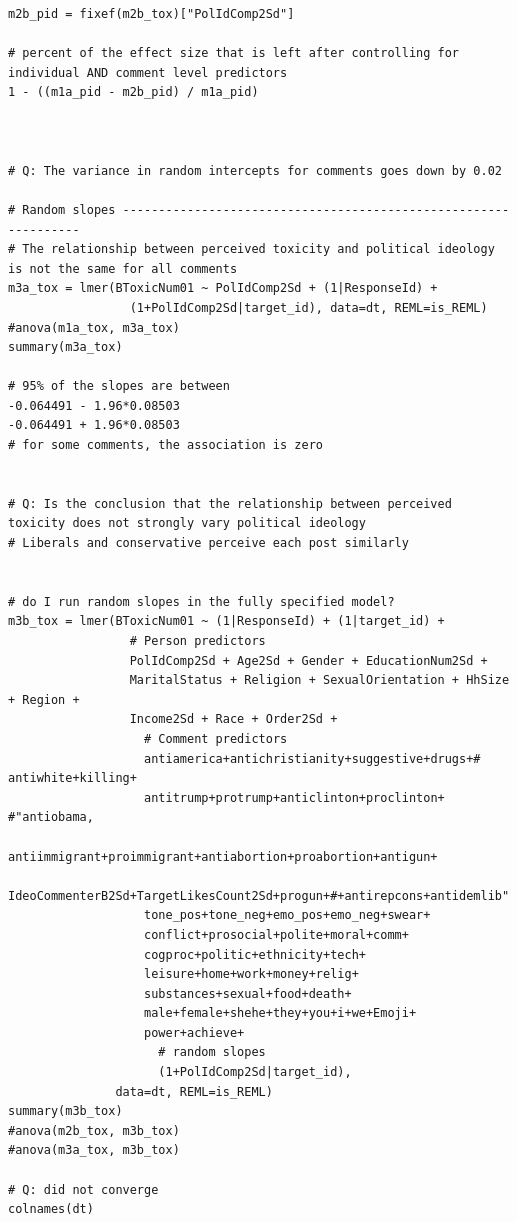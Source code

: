 \documentclass{article}
\begin{document}
\begin{lstlisting}
m2b_pid = fixef(m2b_tox)["PolIdComp2Sd"]

# percent of the effect size that is left after controlling for individual AND comment level predictors
1 - ((m1a_pid - m2b_pid) / m1a_pid)



# Q: The variance in random intercepts for comments goes down by 0.02

# Random slopes ----------------------------------------------------------------
# The relationship between perceived toxicity and political ideology is not the same for all comments
m3a_tox = lmer(BToxicNum01 ~ PolIdComp2Sd + (1|ResponseId) + 
                 (1+PolIdComp2Sd|target_id), data=dt, REML=is_REML)
#anova(m1a_tox, m3a_tox)
summary(m3a_tox)

# 95% of the slopes are between
-0.064491 - 1.96*0.08503 
-0.064491 + 1.96*0.08503
# for some comments, the association is zero


# Q: Is the conclusion that the relationship between perceived toxicity does not strongly vary political ideology
# Liberals and conservative perceive each post similarly


# do I run random slopes in the fully specified model?
m3b_tox = lmer(BToxicNum01 ~ (1|ResponseId) + (1|target_id) + 
                 # Person predictors
                 PolIdComp2Sd + Age2Sd + Gender + EducationNum2Sd + 
                 MaritalStatus + Religion + SexualOrientation + HhSize + Region + 
                 Income2Sd + Race + Order2Sd + 
                   # Comment predictors  
                   antiamerica+antichristianity+suggestive+drugs+# antiwhite+killing+
                   antitrump+protrump+anticlinton+proclinton+ #"antiobama,
                   antiimmigrant+proimmigrant+antiabortion+proabortion+antigun+
                   IdeoCommenterB2Sd+TargetLikesCount2Sd+progun+#+antirepcons+antidemlib"
                   tone_pos+tone_neg+emo_pos+emo_neg+swear+
                   conflict+prosocial+polite+moral+comm+
                   cogproc+politic+ethnicity+tech+
                   leisure+home+work+money+relig+  
                   substances+sexual+food+death+    
                   male+female+shehe+they+you+i+we+Emoji+
                   power+achieve+
                     # random slopes
                     (1+PolIdComp2Sd|target_id),
               data=dt, REML=is_REML)
summary(m3b_tox)
#anova(m2b_tox, m3b_tox)
#anova(m3a_tox, m3b_tox)

# Q: did not converge
colnames(dt)


\end{lstlisting}
\end{document}
